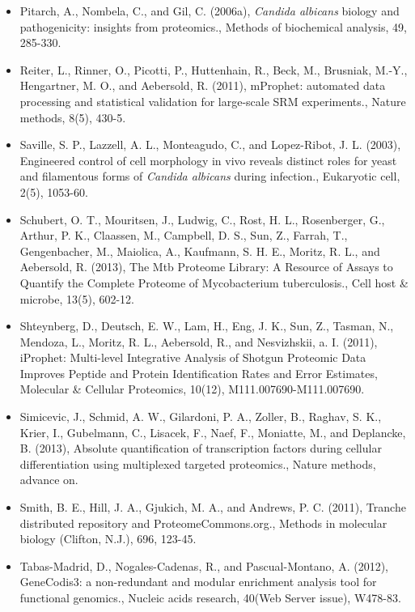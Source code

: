\begin{itemize}
\item[]{
Pitarch, A., Nombela, C., and Gil, C. (2006a), \textit{Candida albicans} biology and pathogenicity:
insights from proteomics., Methods of biochemical analysis, 49, 285-330.
}

\item[]{
Reiter, L., Rinner, O., Picotti, P., Huttenhain, R., Beck, M., Brusniak, M.-Y., Hengartner, M. O.,
and Aebersold, R. (2011), mProphet: automated data processing and statistical validation
for large-scale SRM experiments., Nature methods, 8(5), 430-5.
}

\item[]{
Saville, S. P., Lazzell, A. L., Monteagudo, C., and Lopez-Ribot, J. L. (2003), Engineered control
of cell morphology in vivo reveals distinct roles for yeast and filamentous forms of \textit{Candida
albicans} during infection., Eukaryotic cell, 2(5), 1053-60.
}

\item[]{
Schubert, O. T., Mouritsen, J., Ludwig, C., Rost, H. L., Rosenberger, G., Arthur, P. K., Claassen,
M., Campbell, D. S., Sun, Z., Farrah, T., Gengenbacher, M., Maiolica, A., Kaufmann, S. H. E.,
Moritz, R. L., and Aebersold, R. (2013), The Mtb Proteome Library: A Resource of Assays
to Quantify the Complete Proteome of Mycobacterium tuberculosis., Cell host \& microbe,
13(5), 602-12.
}

\item[]{
Shteynberg, D., Deutsch, E. W., Lam, H., Eng, J. K., Sun, Z., Tasman, N., Mendoza, L., Moritz,
R. L., Aebersold, R., and Nesvizhskii, a. I. (2011), iProphet: Multi-level Integrative Analysis
of Shotgun Proteomic Data Improves Peptide and Protein Identification Rates and Error
Estimates, Molecular \& Cellular Proteomics, 10(12), M111.007690-M111.007690.
}

\item[]{
Simicevic, J., Schmid, A. W., Gilardoni, P. A., Zoller, B., Raghav, S. K., Krier, I., Gubelmann,
C., Lisacek, F., Naef, F., Moniatte, M., and Deplancke, B. (2013), Absolute quantification
of transcription factors during cellular differentiation using multiplexed targeted proteomics.,
Nature methods, advance on.
}

\item[]{
Smith, B. E., Hill, J. A., Gjukich, M. A., and Andrews, P. C. (2011), Tranche 
distributed repository and ProteomeCommons.org., Methods in molecular biology (Clifton, N.J.), 696,
123-45.
}

\item[]{
Tabas-Madrid, D., Nogales-Cadenas, R., and Pascual-Montano, A. (2012), GeneCodis3: a
non-redundant and modular enrichment analysis tool for functional genomics., Nucleic acids
research, 40(Web Server issue), W478-83.
}


\end{itemize}
